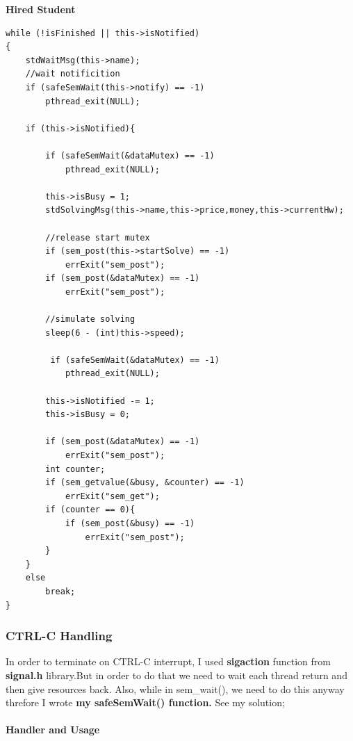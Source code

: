 \documentclass{article}
\begin{document}
\cleardoublepage
\textbf{Hired Student}
\begin{lstlisting}[style=CStyle]
while (!isFinished || this->isNotified)
{
	stdWaitMsg(this->name);
	//wait notificition
	if (safeSemWait(this->notify) == -1)
    	pthread_exit(NULL);
		
	if (this->isNotified){
	
		if (safeSemWait(&dataMutex) == -1)
        	pthread_exit(NULL);
        	
		this->isBusy = 1;
		stdSolvingMsg(this->name,this->price,money,this->currentHw);
		
		//release start mutex
		if (sem_post(this->startSolve) == -1)
			errExit("sem_post");
		if (sem_post(&dataMutex) == -1)
			errExit("sem_post");

		//simulate solving
		sleep(6 - (int)this->speed);

		 if (safeSemWait(&dataMutex) == -1)
         	pthread_exit(NULL);
			
		this->isNotified -= 1;
		this->isBusy = 0;

		if (sem_post(&dataMutex) == -1)
			errExit("sem_post");
		int counter;
		if (sem_getvalue(&busy, &counter) == -1)
			errExit("sem_get");
		if (counter == 0){
			if (sem_post(&busy) == -1)
				errExit("sem_post");
		}
	}
	else
		break;
}
\end{lstlisting}
\subsubsection{CTRL-C Handling}
In order to terminate on CTRL-C interrupt, I used \textbf{sigaction} function from \textbf{signal.h} library.But in order to do that we need to wait
each thread return and then give resources back. Also, while in sem\_wait(), we need to do this anyway threfore I wrote \textbf{my safeSemWait() function.}
See my solution; \\ \\
\textbf{Handler and Usage}
\cleardoublepage
\end{document}
